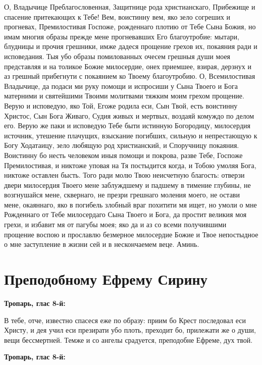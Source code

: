 О, Владычице Преблагословенная, Защитнице рода христианскаго, Прибежище и спасение притекающих к Тебе! Вем, воистинну вем, яко зело согреших и прогневах, Премилостивая Госпоже, рожденнаго плотию от Тебе Сына Божия, но имам многия образы прежде мене прогневавших Его благоутробие: мытари, блудницы и прочия грешники, имже дадеся прощение грехов их, покаяния ради и исповедания. Тыя убо образы помилованных очесем грешныя души моея представляя и на толикое Божие милосердие, онех приемшее, взирая, дерзнух и аз грешный прибегнути с покаянием ко Твоему благоутробию. О, Всемилостивая Владычице, да подаси ми руку помощи и испросиши у Сына Твоего и Бога матерними и святейшими Твоими молитвами тяжким моим грехом прощение. Верую и исповедую, яко Той, Егоже родила еси, Сын Твой, есть воистинну Христос, Сын Бога Живаго, Судия живых и мертвых, воздаяй комуждо по делом его. Верую же паки и исповедую Тебе быти истинную Богородицу, милосердия источник, утешение плачущих, взыскание погибших, сильную и непрестающую к Богу Ходатаицу, зело любящую род христианский, и Споручницу покаяния. Воистинну бо несть человеком иныя помощи и покрова, разве Тебе, Госпоже Премилостивая, и никтоже уповая на Тя постыдится когда, и Тобою умоляя Бога, никтоже оставлен бысть. Того ради молю Твою неисчетную благость: отверзи двери милосердия Твоего мене заблуждшему и падшему в тимение глубины, не возгнушайся мене, сквернаго, не презри грешнаго моления моего, не остави мене, окаяннаго, яко в погибель злобный враг похитити мя ищет, но умоли о мне Рожденнаго от Тебе милосердаго Сына Твоего и Бога, да простит великия моя грехи, и избавит мя от пагубы моея; яко да и аз со всеми получившими прощение воспою и прославлю безмерное милосердие Божие и Твое непостыдное о мне заступление в жизни сей и в нескончаемем веце. Аминь.


\section{Преподобному Ефрему Сирину}
 


\bfseries Тропарь, глас 8-й:\normalfont{}


В тебе, отче, известно спасеся еже по образу: приим бо Крест последовал еси Христу, и дея учил еси презирати убо плоть, преходит бо, прилежати же о души, вещи бессмертней. Темже и со ангелы срадуется, преподобне Ефреме, дух твой.


\medskip


\bfseries Тропарь, глас 8-й:\normalfont{}


